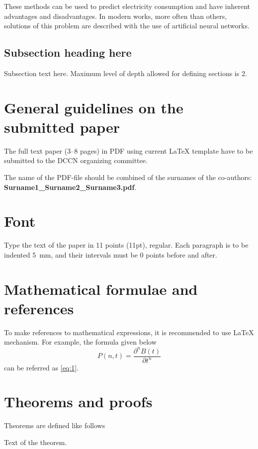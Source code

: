 \documentclass[11pt]{article}
\begin{document}
These methods can be used to predict electricity consumption and have inherent advantages and disadvantages. In modern works, more often than others, solutions of this problem are described with the use of artificial neural networks.


\subsection{Subsection heading here}

Subsection text here. Maximum level of depth allowed for defining sections is 2.


\section{General guidelines on the submitted paper}

The full text paper (3--8 pages) in PDF using current \LaTeX{} template have to be submitted to the DCCN organizing committee.

The name of the PDF-file should be combined of the surnames of the co-authors:
\textbf{Surname1\_Surname2\_Surname3.pdf}.

\section{Font}

Type the text of the paper in 11 points (11pt), regular. Each
paragraph is to be indented 5~mm, and their intervals must be 0
points before and after.

\section{Mathematical formulae and references}

To make references to mathematical expressions, it is
recommended to use \LaTeX{} mechanism. For example, the formula
given below
\begin{equation}
\label{eq:1}
P(n,t)=\frac{\partial^n B(t)}{\partial t^n}
\end{equation}
can be referred as \eqref{eq:1}.

\section{Theorems and proofs}

Theorems are defined like follows
\begin{thm}\label{thm1}
Text of the theorem.
\end{thm}
\end{document}

